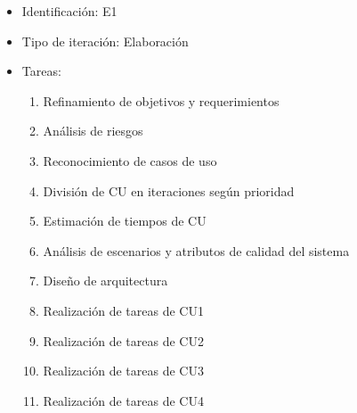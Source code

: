 \begin{itemize}
\item Identificación: E1
\item Tipo de iteración: Elaboración
\item Tareas:
	\begin{enumerate}
	\item Refinamiento de objetivos y requerimientos
	\item Análisis de riesgos
	\item Reconocimiento de casos de uso
	\item División de CU en iteraciones según prioridad
	\item Estimación de tiempos de CU
	\item Análisis de escenarios y atributos de calidad del sistema
	\item Diseño de arquitectura
	\item Realización de tareas de CU1
	\item Realización de tareas de CU2
	\item Realización de tareas de CU3
	\item Realización de tareas de CU4	
	\end{enumerate}
\end{itemize}

